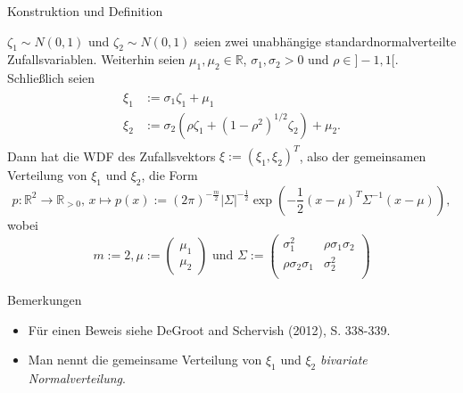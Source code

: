 \documentclass[
  8pt,
  ignorenonframetext,
]{beamer}
\providecommand{\tightlist}{%
  \setlength{\itemsep}{0pt}\setlength{\parskip}{0pt}}
\begin{document}
\begin{frame}{Konstruktion und Definition}
\protect\hypertarget{konstruktion-und-definition-2}{}
\footnotesize
\begin{theorem}
\justifying
\normalfont
$\zeta_1 \sim N(0,1)$ und $\zeta_2 \sim N(0,1)$ seien zwei unabhängige 
standardnormalverteilte  Zufallsvariablen. Weiterhin seien $\mu_1,\mu_2\in \mathbb{R}$,
$\sigma_1,\sigma_2>0$ und $\rho \in ]-1,1[$. Schließlich seien
\begin{align}
\begin{split}
\xi_1 & := \sigma_1\zeta_1 + \mu_1                                            \\
\xi_2 & := \sigma_2\left(\rho\zeta_1 + (1 -\rho^2)^{1/2}\zeta_2\right) + \mu_2. 
\end{split}
\end{align}
Dann hat die WDF des Zufallsvektors $\xi := (\xi_1,\xi_2)^T$, also der gemeinsamen 
Verteilung von $\xi_1$ und $\xi_2$, die Form
\begin{equation}
p : \mathbb{R}^2 \to \mathbb{R}_{>0},\, x \mapsto p(x)
:= (2\pi)^{-\frac{m}{2}}|\Sigma|^{-\frac{1}{2}}\exp\left(-\frac{1}{2}(x-\mu)^T \Sigma^{-1} (x-\mu)\right),
\end{equation}
wobei
\begin{equation}
m := 2,
\mu :=
\begin{pmatrix}
\mu_1 \\
\mu_2
\end{pmatrix}
\mbox{ und }
\Sigma :=
\begin{pmatrix}
\sigma_1^2           & \rho\sigma_1\sigma_2 \\
\rho\sigma_2\sigma_1 & \sigma_2^2           \\
\end{pmatrix}
\end{equation}

\end{theorem}

Bemerkungen

\begin{itemize}
\tightlist
\item
  Für einen Beweis siehe DeGroot and Schervish (2012), S. 338-339.
\item
  Man nennt die gemeinsame Verteilung von \(\xi_1\) und \(\xi_2\)
  \emph{bivariate Normalverteilung}.
\end{itemize}
\end{frame}
\end{document}
